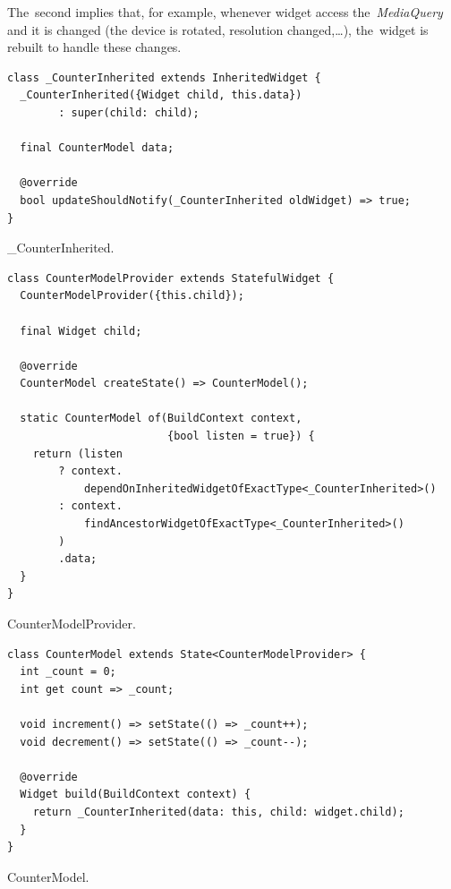 The~second implies that, for example, whenever widget access the~\textit{MediaQuery} and it is changed (the device is rotated, resolution changed,\ldots ), the~widget is rebuilt to handle these changes. 

\begin{listing}[ht]
\begin{verbatim}
class _CounterInherited extends InheritedWidget {
  _CounterInherited({Widget child, this.data}) 
        : super(child: child);

  final CounterModel data;

  @override
  bool updateShouldNotify(_CounterInherited oldWidget) => true;
}
\end{verbatim}
\caption{\_CounterInherited.}
\label{listing:counter-inherited-counter-inherited}
\end{listing}

\begin{listing}[ht]
\begin{verbatim}
class CounterModelProvider extends StatefulWidget {
  CounterModelProvider({this.child});
  
  final Widget child;
  
  @override
  CounterModel createState() => CounterModel();

  static CounterModel of(BuildContext context, 
                         {bool listen = true}) {
    return (listen
        ? context.
            dependOnInheritedWidgetOfExactType<_CounterInherited>()
        : context.
            findAncestorWidgetOfExactType<_CounterInherited>()
        )
        .data;
  }
}
\end{verbatim}
\caption{CounterModelProvider.}
\label{listing:counter-inherited-model-provider}
\end{listing}

\begin{listing}[ht]
\begin{verbatim}
class CounterModel extends State<CounterModelProvider> {
  int _count = 0;
  int get count => _count;

  void increment() => setState(() => _count++);
  void decrement() => setState(() => _count--);

  @override
  Widget build(BuildContext context) {
    return _CounterInherited(data: this, child: widget.child);
  }
}
\end{verbatim}
\caption{CounterModel.}
\label{listing:counter-inherited-counter-model}
\end{listing}

